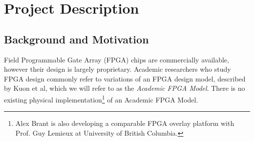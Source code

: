 \section{Project Description}

\subsection{Background and Motivation}

%
%
%

Field Programmable Gate Array (FPGA) chips are commercially available, however their design is largely proprietary.\citationneeded
Academic researchers who study FPGA design commonly refer to variations of an FPGA design model, described by Kuon et al\cite{fpga}, which we will refer to as the \emph{Academic FPGA Model}.
There is no existing physical implementation\footnote{Alex Brant is also developing a comparable FPGA overlay platform with Prof. Guy Lemieux at University of British Columbia.} of an Academic FPGA Model.

